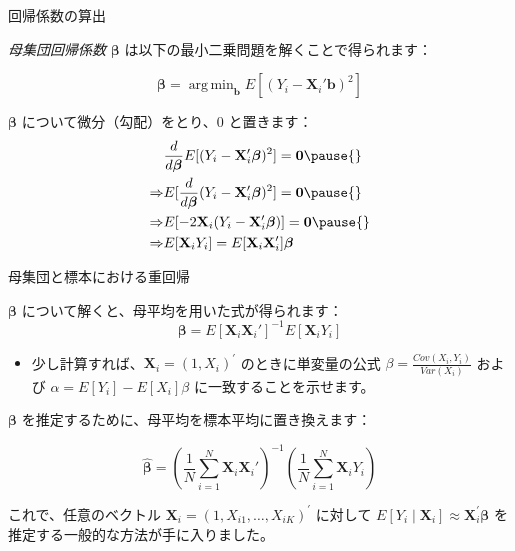 \documentclass[11pt,handout]{beamer}
\newenvironment{wideitemize}{\itemize\addtolength{\itemsep}{10pt}}{\enditemize}
\DeclareMathOperator*{\argmin}{arg\,min}
\begin{document}
	\begin{frame}{回帰係数の算出}
		\begin{wideitemize}
			\item
			\emph{母集団回帰係数} $\boldsymbol\beta$ は以下の最小二乗問題を解くことで得られます：
						
			$$\bm{\beta} = \argmin_{\mathbf{b}} E[ (Y_i - \mathbf{X}_i '\mathbf{b})^2]$$
			
			\pause
			\item
			$\bm{\beta}$ について微分（勾配）をとり、0 と置きます：
			\begin{align*}
				& \dfrac{d}{d \bm{\beta}} E[ (Y_i - \mathbf{X}_i '\bm{\beta})^2] = \mathbf{0} \pause{} \\
				\Rightarrow & E[ \dfrac{d}{d \bm{\beta}} (Y_i - \mathbf{X}_i '\bm{\beta})^2] = \mathbf{0} \pause{} \\
				\Rightarrow & E[-2 \mathbf{X}_i (Y_i - \mathbf{X}_i '\bm{\beta})] = \mathbf{0} \pause{}\\
				\Rightarrow & E[\mathbf{X}_i Y_i] = E[\mathbf{X}_i \mathbf{X}_i ']\bm{\beta}
			\end{align*}
		
	
		\end{wideitemize}
	\end{frame}
	
	
	\begin{frame}{母集団と標本における重回帰}
		\begin{wideitemize}
			\item
			$\bm{\beta}$ について解くと、母平均を用いた式が得られます：
			$$\bm{\beta} = E[ \bm{X}_i \bm{X}_i'  ]^{-1} E[\bm{X}_i Y_i] $$
			\vspace{-0.3cm}
			\begin{itemize}
			\item 少し計算すれば、$\mathbf{X}_i=(1,X_i)^\prime$ のときに単変量の公式 $\beta=\frac{Cov(X_i,Y_i)}{Var(X_i)}$ および $\alpha=E[Y_i]-E[X_i]\beta$ に一致することを示せます。
			\end{itemize}
			\pause\smallskip
			\item
			$\bm{\beta}$ を推定するために、母平均を標本平均に置き換えます：
			
			\pause
			$$ \bm{\hat\beta} = \left( \frac{1}{N} \sum_{i=1}^N \bm{X}_i \bm{X}_i' \right)^{-1}  \left( \frac{1}{N} \sum_{i=1}^N \bm{X}_i Y_i \right)$$
			
			\pause\smallskip
			\item 
			これで、任意のベクトル $\mathbf{X}_i=(1,X_{i1},\dots,X_{iK})^\prime$ に対して $E[Y_i\mid \mathbf{X}_i]\approx \mathbf{X}_i^\prime\boldsymbol{\beta}$ を推定する一般的な方法が手に入りました。
		\end{wideitemize}
	\end{frame}
	
\end{document}
